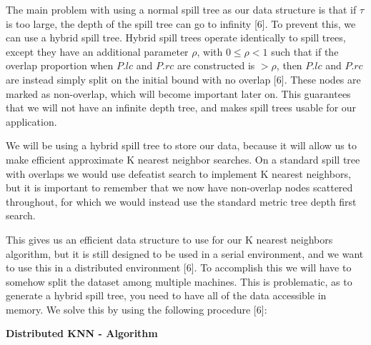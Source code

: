 \vspace{5 mm}
\noindent
The main problem with using a normal spill tree as our data structure is that if
$\tau$ is too large, the depth of the spill tree can go to infinity [6].  To prevent
this, we can use a hybrid spill tree.  Hybrid spill trees operate identically to
spill trees, except they have an additional parameter $\rho$, with $0 \le \rho <
1$  such that if the overlap proportion when $P.lc$ and $P.rc$ are constructed
is  $> \rho$, then $P.lc$ and $P.rc$ are instead simply split on the initial
bound with no overlap [6].  These nodes are marked as non-overlap, which will
become  important later on.  This guarantees that we will not have an infinite
depth  tree, and makes spill trees usable for our application.

\vspace{5 mm}
\noindent
We will be using a hybrid spill tree to store our data, because it will allow us
to make efficient approximate K nearest neighbor searches.  On a standard spill
tree with overlaps we would use defeatist search to implement K nearest
neighbors,  but it is important to remember that we now have non-overlap nodes
scattered  throughout, for which we would instead use the standard metric tree
depth first search.

\vspace{5 mm}
\noindent
This gives us an efficient data structure to use for our K nearest neighbors
algorithm, but it is still designed to be used in a serial environment, and we
want to use this in a distributed environment [6].  To accomplish this we will have
to somehow split the dataset among multiple machines.  This is problematic, as
to generate a hybrid spill tree, you need to have all of the data accessible in
memory.  We solve this by using the following procedure [6]:

\vspace{5 mm}
\noindent
\textbf{Distributed KNN - Algorithm}

